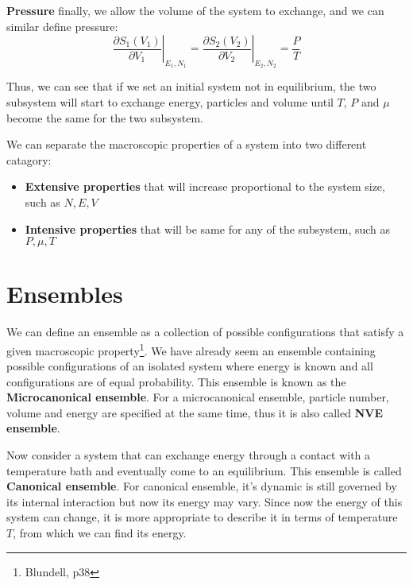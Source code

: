 \documentclass{article}
\begin{document}
\textbf{Pressure}
finally, we allow the volume of the system to exchange, and we can similar define pressure:
\begin{equation}
    \left. \frac{\partial S_1(V_1)}{\partial V_1} \right|_{E_1,N_1} = \left. \frac{\partial S_2(V_2)}{\partial V_2}\right|_{E_2,N_2} = \frac{P}{T}
\end{equation}

Thus, we can see that if we set an initial system not in equilibrium, the two subsystem will
start to exchange energy, particles and volume until $T$, $P$ and $\mu$ become the same 
for the two subsystem. 

We can separate the macroscopic properties of a system into two different catagory:
\begin{itemize}
    \item \textbf{Extensive properties} that will increase proportional to the system size, such as $N,E,V$
    \item \textbf{Intensive properties} that will be same for any of the subsystem, such as  $P,\mu,T$
\end{itemize}

\pagebreak
\section{Ensembles}
We can define an ensemble as a collection of possible configurations that satisfy a given macroscopic 
property\footnote{Blundell, p38}.
We have already seem an ensemble containing possible configurations of an isolated system where energy
is known and all configurations are of equal probability. 
This ensemble is known as the \textbf{Microcanonical ensemble}. For a microcanonical ensemble, particle 
number, volume and energy are specified at the same time, thus it is also called \textbf{NVE ensemble}.

Now consider a system that can exchange energy through a contact with a temperature bath and eventually 
come to an equilibrium. This ensemble is called \textbf{Canonical ensemble}. For canonical ensemble, 
it's dynamic is still governed by its internal interaction but now its energy may vary. Since now 
the energy of this system can change, it is more appropriate to describe it in terms of 
temperature $T$, from which we can find its energy. 
\end{document}
